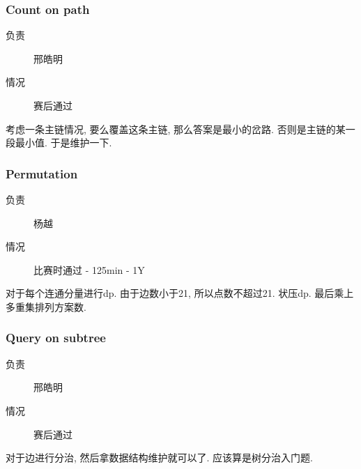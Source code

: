\documentclass[a4paper, 11pt, nofonts, nocap, fancyhdr]{ctexart}
\newcommand{\problem}[1]{\subsubsection{#1}}
\begin{document}
\problem{Count on path}

\begin{description}
\item[负责] 邢皓明
\item[情况] 赛后通过
	
\end{description}

考虑一条主链情况, 要么覆盖这条主链, 那么答案是最小的岔路. 否则是主链的某一段最小值. 于是维护一下.

\problem{Permutation}

\begin{description}
\item[负责] 杨越
\item[情况] 比赛时通过 - 125min - 1Y
\end{description}

对于每个连通分量进行dp. 由于边数小于21, 所以点数不超过21. 状压dp. 最后乘上多重集排列方案数.

\problem{Query on subtree}

\begin{description}
\item[负责] 邢皓明
\item[情况] 赛后通过
	
\end{description}

对于边进行分治, 然后拿数据结构维护就可以了. 应该算是树分治入门题.

\problem{Exclusive or}
	

\begin{description}
\item[负责] 邢皓明
\item[情况] 赛后通过
	
\end{description}

考虑每位是1的情况下, 有多少方案使得当前第i位是1, 这个数位dp一下就好了.

\problem{Matrix Multiplion}
	

\begin{description}
\item[负责] 邢皓明
\item[情况] 比赛时通过 - 37min - 2Y
	
\end{description}

压二进制后矩阵乘法.

\section{总结}

	两人打比赛真是累炸, 让我这种嘴巴选手如何是好. 
	
	两人打比赛感觉前期比较辛苦. 需要思考的题目非常多, 往往不知道从哪题先开始.
	
	还好叉姐的题目真良心, 没有什么较长难懂的题面. 所以我们两人很快就把题目全部看完了. 
	
	然后两人比赛的话, 没有办法深入思考一道题, 导致了今天B的失误. xhm今天特别紧张的感觉.
	
	这次的机子倒是一直有用着, 没有出现空机器的情况. 
	
	今天出现了沟通不畅的情况, 我最后想出B的想法, 是xhm早就想出的, 但是他没有和我说, 只是过了脑海之后觉得很复杂没有细想. 其实只要深入思考的话发现是很容易实现的. 
\end{document}
